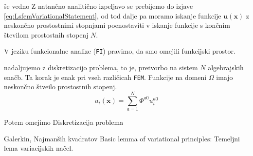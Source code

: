 še vedno  Z natančno analitično izpeljavo se prebijemo do izjave \eqref{eq:LsfemVariationalStatement}, od tod dalje pa moramo iskanje funkcije $\mathbf{u(x)}$ z neskončno prostostnimi stopnjami poenostaviti v iskanje funkcije s končnim številom prostostnih stopenj $N$. 

V jeziku funkcionalne analize (\texttt{FI}) pravimo, da smo omejili funkcijski prostor.

nadaljujemo z diskretizacijo problema, to je, pretvorbo na sistem $N$ algebrajskih enačb. Ta korak je enak pri vseh različicah \texttt{FEM}. Funkcije na domeni $\Omega$ imajo neskončno štveilo prostostnih stopenj. 
\begin{equation}
    u_i(\mathbf{x}) = \sum_{a = 1}^N \Phi^{a0} u^{a0}_i
\end{equation}

Potem omejimo Diskretizacija problema 

Galerkin, Najmanših kvadratov \cite{JiangB-LSFEM}
Basic lemma of variational principles: Temeljni lema variacijskih načel.